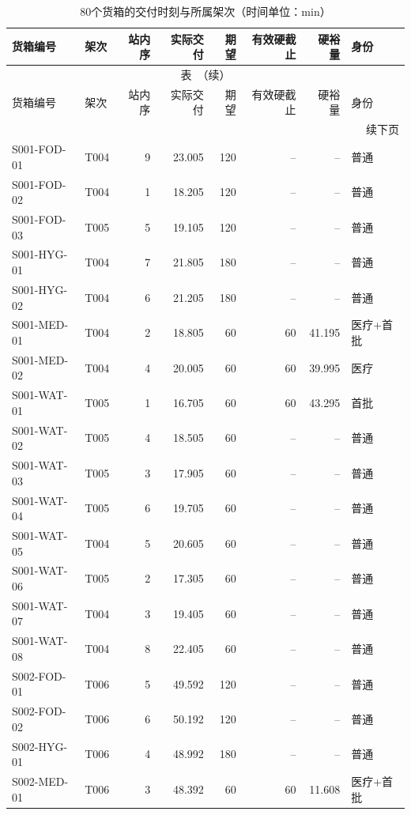 \begingroup
\small
\setlength{\tabcolsep}{3pt}
\renewcommand{\arraystretch}{1.10}
\begin{longtable}{@{}llrrrrrl@{}}
\caption{80个货箱的交付时刻与所属架次（时间单位：min）}\label{tab:q3-deliveries}\\
\toprule
货箱编号 & 架次 & 站内序 & 实际交付 & 期望 & 有效硬截止 & 硬裕量 & 身份 \\
\midrule
\endfirsthead
\multicolumn{8}{c}{\small 表~\thetable{}（续）}\\
\toprule
货箱编号 & 架次 & 站内序 & 实际交付 & 期望 & 有效硬截止 & 硬裕量 & 身份 \\
\midrule
\endhead
\midrule
\multicolumn{8}{r}{\small 续下页}\\
\endfoot
\bottomrule
\endlastfoot
S001-FOD-01 & T004 & 9 & 23.005 & 120 & -- & -- & 普通 \\
S001-FOD-02 & T004 & 1 & 18.205 & 120 & -- & -- & 普通 \\
S001-FOD-03 & T005 & 5 & 19.105 & 120 & -- & -- & 普通 \\
S001-HYG-01 & T004 & 7 & 21.805 & 180 & -- & -- & 普通 \\
S001-HYG-02 & T004 & 6 & 21.205 & 180 & -- & -- & 普通 \\
S001-MED-01 & T004 & 2 & 18.805 & 60 & 60 & 41.195 & 医疗+首批 \\
S001-MED-02 & T004 & 4 & 20.005 & 60 & 60 & 39.995 & 医疗 \\
S001-WAT-01 & T005 & 1 & 16.705 & 60 & 60 & 43.295 & 首批 \\
S001-WAT-02 & T005 & 4 & 18.505 & 60 & -- & -- & 普通 \\
S001-WAT-03 & T005 & 3 & 17.905 & 60 & -- & -- & 普通 \\
S001-WAT-04 & T005 & 6 & 19.705 & 60 & -- & -- & 普通 \\
S001-WAT-05 & T004 & 5 & 20.605 & 60 & -- & -- & 普通 \\
S001-WAT-06 & T005 & 2 & 17.305 & 60 & -- & -- & 普通 \\
S001-WAT-07 & T004 & 3 & 19.405 & 60 & -- & -- & 普通 \\
S001-WAT-08 & T004 & 8 & 22.405 & 60 & -- & -- & 普通 \\
S002-FOD-01 & T006 & 5 & 49.592 & 120 & -- & -- & 普通 \\
S002-FOD-02 & T006 & 6 & 50.192 & 120 & -- & -- & 普通 \\
S002-HYG-01 & T006 & 4 & 48.992 & 180 & -- & -- & 普通 \\
S002-MED-01 & T006 & 3 & 48.392 & 60 & 60 & 11.608 & 医疗+首批 \\

\end{longtable}
